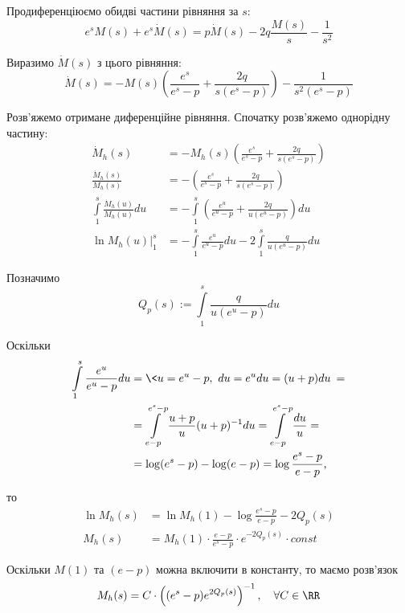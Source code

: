 Продиференціюємо обидві частини рівняння за $s$:
\begin{equation}
e^s M(s) + e^s \dot M(s) =p \dot M(s) - 2 q \frac{M(s)}{s}  - \frac1{s^2}
\end{equation}

Виразимо $\dot M(s)$ з цього рівняння:
\begin{equation}
\label{eq:model_laplace_diff}
\dot M(s) = - M(s)\left(\frac{e^s}{e^s - p} + \frac{2q}{s(e^s - p)}\right) - \frac{1}{s^2(e^s - p)}
\end{equation}

Розв'яжемо отримане диференційне рівняння. Спочатку розв'яжемо однорідну частину:
\begin{align*}
\dot M_h (s) &= - M_h (s)\left(\frac{e^s}{e^s - p} + \frac{2q}{s(e^s - p)}\right) \\
\frac{\dot M_h (s)}{M_h (s)} &= -\left(\frac{e^s}{e^s - p} + \frac{2q}{s(e^s - p)}\right) \\
\int\limits_1^s \frac{\dot M_h (u)}{M_h (u)} du &= -\int\limits_1^s \left(\frac{e^u}{e^u - p} + \frac{2q}{u(e^u - p)}\right) du \\
\left. \ln{M_h (u)}\right|_1^s &= - \int\limits_1^s \frac{e^u}{e^u - p} du  - 2 \int\limits_1^s \frac{q}{u(e^u - p)} du
\end{align*}

Позначимо
\begin{equation}
\label{eq:partial_li_p}
Q_p(s) := \int\limits_1^s \frac{q}{u(e^u - p)} du
\end{equation}

Оскільки
\begin{align*}
\int\limits_1^s \frac{e^u}{e^u - p} du &= \< u = e^u - p,~ du = e^u du = (u+p) du \> = \\
&= \int\limits_{e-p}^{e^s -p} \frac{u + p}{u} (u+p)^{-1} du = 
\int\limits_{e-p}^{e^s -p} \frac{du}{u} = \\
&= \log(e^s - p) - \log(e-p) = \log \frac{e^s - p}{e - p} \text{,}
\end{align*}

то
\begin{align*}
\ln{M_h (s)} &= \ln{M_h (1)} - \log \frac{e^s - p}{e - p} - 2Q_p(s) \\
M_h (s) &= M_h (1) \cdot \frac{e - p}{e^s - p} \cdot e^{- 2Q_p(s)} \cdot const
\end{align*}

Оскільки $M(1)$ та $(e-p)$ можна включити в константу, то маємо розв'язок
\begin{equation}
\label{eq:model_laplace_homogen_sol}
M_h (s) = C \cdot \left((e^s - p)  e^{2Q_p(s)}\right)^{-1}, \quad \forall C \in \RR
\end{equation}

